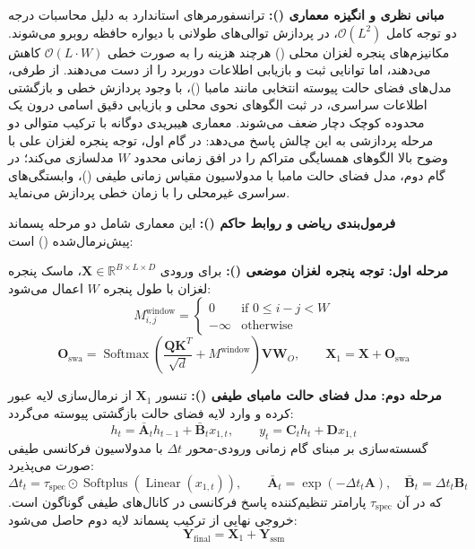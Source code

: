 \textbf{مبانی نظری و انگیزه معماری ():}
ترانسفورمرهای استاندارد به دلیل محاسبات درجه دو توجه کامل $\mathcal{O}(L^2)$، در پردازش توالی‌های طولانی با دیواره حافظه روبرو می‌شوند. مکانیزم‌های پنجره لغزان محلی () هرچند هزینه را به صورت خطی $\mathcal{O}(L \cdot W)$ کاهش می‌دهند، اما توانایی ثبت و بازیابی اطلاعات دوربرد را از دست می‌دهند. از طرفی، مدل‌های فضای حالت پیوسته انتخابی مانند مامبا ()، با وجود پردازش خطی و بازگشتی اطلاعات سراسری، در ثبت الگوهای نحوی محلی و بازیابی دقیق اسامی درون یک محدوده کوچک دچار ضعف می‌شوند.
معماری هیبریدی دوگانه  با ترکیب متوالی دو مرحله پردازشی به این چالش پاسخ می‌دهد: در گام اول، توجه پنجره لغزان علی با وضوح بالا الگوهای همسایگی متراکم را در افق زمانی محدود $W$ مدلسازی می‌کند؛ در گام دوم، مدل فضای حالت مامبا با مدولاسیون مقیاس زمانی طیفی ()، وابستگی‌های سراسری غیرمحلی را با زمان خطی پردازش می‌نماید.

\textbf{فرمول‌بندی ریاضی و روابط حاکم ():}
این معماری شامل دو مرحله پسماند پیش‌نرمال‌شده () است:

\textbf{مرحله اول: توجه پنجره لغزان موضعی ():}
برای ورودی $\mathbf{X} \in \mathbb{R}^{B \times L \times D}$، ماسک پنجره لغزان با طول پنجره $W$ اعمال می‌شود:
\begin{equation}
M_{i, j}^{\text{window}} = \begin{cases}
0 & \text{if } 0 \le i - j < W \\
-\infty & \text{otherwise}
\end{cases}
\end{equation}
\begin{equation}
\mathbf{O}_{\text{swa}} = \operatorname{Softmax}\left(\frac{\mathbf{Q} \mathbf{K}^T}{\sqrt{d}} + M^{\text{window}}\right) \mathbf{V} \mathbf{W}_O, \qquad
\mathbf{X}_1 = \mathbf{X} + \mathbf{O}_{\text{swa}}
\end{equation}

\textbf{مرحله دوم: مدل فضای حالت مامبای طیفی ():}
تنسور $\mathbf{X}_1$ از نرمال‌سازی لایه عبور کرده و وارد لایه فضای حالت بازگشتی پیوسته می‌گردد:
\begin{equation}
h_t = \bar{\mathbf{A}}_t h_{t-1} + \bar{\mathbf{B}}_t x_{1, t}, \qquad y_t = \mathbf{C}_t h_t + \mathbf{D} x_{1, t}
\end{equation}
گسسته‌سازی بر مبنای گام زمانی ورودی-محور $\Delta t$ با مدولاسیون فرکانسی طیفی صورت می‌پذیرد:
\begin{equation}
\Delta t_t = \tau_{\text{spec}} \odot \operatorname{Softplus}(\operatorname{Linear}(x_{1, t})), \qquad
\bar{\mathbf{A}}_t = \exp(-\Delta t_t \mathbf{A}), \quad \bar{\mathbf{B}}_t = \Delta t_t \mathbf{B}_t
\end{equation}
که در آن $\tau_{\text{spec}}$ پارامتر تنظیم‌کننده پاسخ فرکانسی در کانال‌های طیفی گوناگون است. خروجی نهایی از ترکیب پسماند لایه دوم حاصل می‌شود:
\begin{equation}
\mathbf{Y}_{\text{final}} = \mathbf{X}_1 + \mathbf{Y}_{\text{ssm}}
\end{equation}

